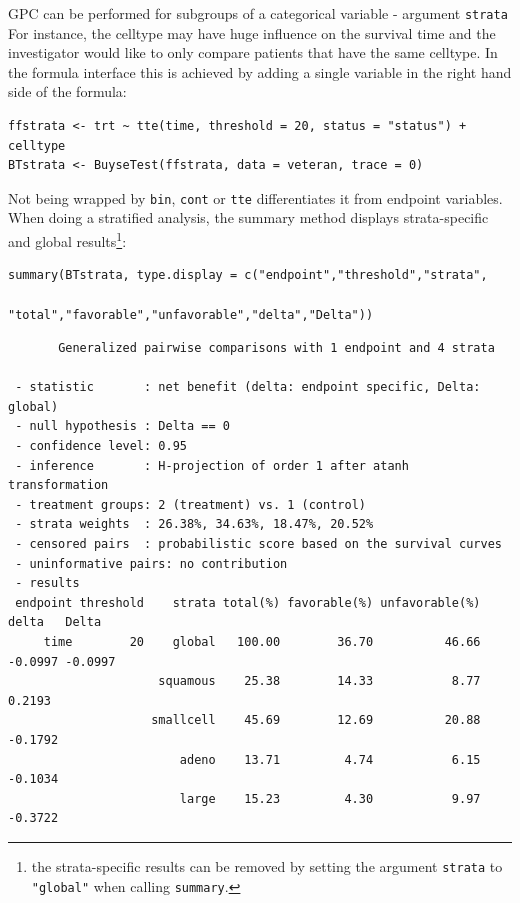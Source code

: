 \documentclass[12pt]{article}
\begin{document}
GPC can be performed for subgroups of a categorical variable \hfill -
argument \texttt{strata} \newline For instance, the celltype may have huge
influence on the survival time and the investigator would like to only
compare patients that have the same celltype. In the formula interface
this is achieved by adding a single variable in the right hand side of
the formula:
\lstset{language=r,label= ,caption= ,captionpos=b,numbers=none}
\begin{lstlisting}
ffstrata <- trt ~ tte(time, threshold = 20, status = "status") + celltype
BTstrata <- BuyseTest(ffstrata, data = veteran, trace = 0)
\end{lstlisting}

Not being wrapped by \texttt{bin}, \texttt{cont} or \texttt{tte} differentiates it from
endpoint variables. When doing a stratified analysis, the summary
method displays strata-specific and global results\footnote{the
strata-specific results can be removed by setting the argument
\texttt{strata} to \texttt{"global"} when calling \texttt{summary}.}:
\lstset{language=r,label= ,caption= ,captionpos=b,numbers=none}
\begin{lstlisting}
summary(BTstrata, type.display = c("endpoint","threshold","strata",
                                   "total","favorable","unfavorable","delta","Delta"))
\end{lstlisting}

\begin{verbatim}
       Generalized pairwise comparisons with 1 endpoint and 4 strata

 - statistic       : net benefit (delta: endpoint specific, Delta: global) 
 - null hypothesis : Delta == 0 
 - confidence level: 0.95 
 - inference       : H-projection of order 1 after atanh transformation 
 - treatment groups: 2 (treatment) vs. 1 (control) 
 - strata weights  : 26.38%, 34.63%, 18.47%, 20.52% 
 - censored pairs  : probabilistic score based on the survival curves
 - uninformative pairs: no contribution
 - results
 endpoint threshold    strata total(%) favorable(%) unfavorable(%)   delta   Delta
     time        20    global   100.00        36.70          46.66 -0.0997 -0.0997
                     squamous    25.38        14.33           8.77  0.2193        
                    smallcell    45.69        12.69          20.88 -0.1792        
                        adeno    13.71         4.74           6.15 -0.1034        
                        large    15.23         4.30           9.97 -0.3722
\end{verbatim}
\end{document}
